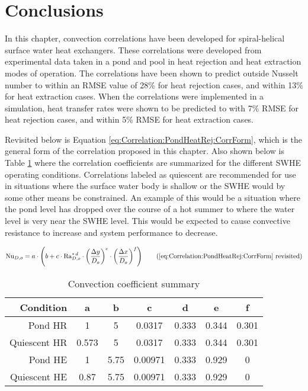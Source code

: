\section{Conclusions}
\label{sec:Correlation:Conclusions}

In this chapter, convection correlations have been developed for spiral-helical surface water heat exchangers. These correlations were developed from experimental data taken in a pond and pool in heat rejection and heat extraction modes of operation. The correlations have been shown to predict outside Nusselt number to within an RMSE value of 28\% for heat rejection cases, and within 13\% for heat extraction cases. When the correlations were implemented in a simulation, heat transfer rates were shown to be predicted to with 7\% RMSE for heat rejection cases, and within 5\% RMSE for heat extraction cases.

Revisited below is Equation \ref{eq:Correlation:PondHeatRej:CorrForm}, which is the general form of the correlation proposed in this chapter. Also shown below is Table \ref{tab:Correlation:Conclusion} where the correlation coefficients are summarized for the different SWHE operating conditions. Correlations labeled as quiescent are recommended for use in situations where the surface water body is shallow or the SWHE would by some other means be constrained. An example of this would be a situation where the pond level has dropped over the course of a hot summer to where the water level is very near the SWHE level. This would be expected to cause convective resistance to increase and system performance to decrease.

\begin{equation}
	\mbox{Nu}_{D,o} = a \cdot \left( b+ c \cdot \mbox{Ra}_{D,o}^{* \, d} \cdot \left(\frac{\Delta y}{D_o}\right)^{e} \cdot \left(\frac{\Delta x}{D_o}\right)^{f} \right)
	\tag{\ref{eq:Correlation:PondHeatRej:CorrForm} revisited}
\end{equation}

	\begin{table}[h]
		\centering
		\caption{Convection coefficient summary}
		\label{tab:Correlation:Conclusion}
		\begin{tabular}{r | c c c c c c}
			\hline
			Condition & a & b & c & d & e & f \\
			\hline\hline
			Pond HR & 1 & 5 & 0.0317 & 0.333 & 0.344 & 0.301 \\
			\hline
			Quiescent HR & 0.573 & 5 & 0.0317 & 0.333 & 0.344 & 0.301 \\
			\hline	
			Pond HE & 1 & 5.75 & 0.00971 & 0.333 & 0.929 & 0 \\
			\hline
			Quiescent HE & 0.87 & 5.75 & 0.00971 & 0.333 & 0.929 & 0 \\
			\hline		
		\end{tabular}
	\end{table}
	
